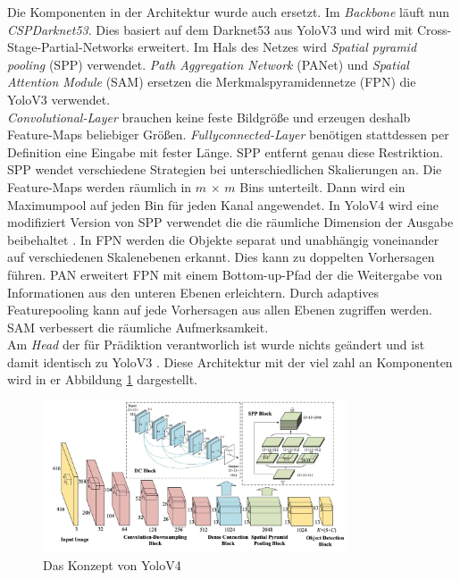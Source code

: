 \documentclass[conference]{IEEEtran}
\begin{document}
	Die Komponenten in der Architektur wurde auch ersetzt. Im \textit{Backbone} läuft nun \textit{CSPDarknet53}. Dies basiert auf dem Darknet53 aus YoloV3 und wird mit Cross-Stage-Partial-Networks erweitert. Im Hals des Netzes wird \textit{Spatial pyramid pooling} (SPP) verwendet. \textit{Path Aggregation Network} (PANet) und \textit{Spatial Attention Module} (SAM) ersetzen die Merkmalspyramidennetze (FPN) die YoloV3 verwendet.\\
	\textit{Convolutional-Layer} brauchen keine feste Bildgröße und erzeugen deshalb  Feature-Maps beliebiger Größen. \textit{Fullyconnected-Layer} benötigen stattdessen per Definition eine Eingabe mit fester Länge. SPP entfernt genau diese Restriktion. SPP wendet verschiedene Strategien bei unterschiedlichen Skalierungen an. Die Feature-Maps werden räumlich in $m$ × $m$ Bins unterteilt. Dann wird ein Maximumpool auf jeden Bin für jeden Kanal angewendet. In YoloV4 wird eine modifiziert Version von SPP verwendet die die räumliche Dimension der Ausgabe beibehaltet \cite{b9}.
	In FPN werden die Objekte separat und unabhängig voneinander auf verschiedenen Skalenebenen erkannt. Dies kann zu doppelten Vorhersagen führen. PAN erweitert FPN mit einem Bottom-up-Pfad der die Weitergabe von Informationen aus den unteren Ebenen erleichtern. Durch adaptives Featurepooling kann auf jede Vorhersagen aus allen Ebenen zugriffen werden.\cite{b10}\\
	SAM verbessert die räumliche Aufmerksamkeit.\\
	Am \textit{Head} der für Prädiktion verantworlich ist wurde nichts geändert und  ist damit identisch zu YoloV3 \cite{b2}\cite{b8}. Diese Architektur mit der viel zahl an Komponenten wird in er Abbildung \ref{V4Arch} dargestellt.
	\begin{figure}[!h]
		\begin{center}
			\includegraphics[width=9cm]{Media/YoloV4Arch.jpeg}
			\caption{Das Konzept von YoloV4 \cite{b8}}
			\label{V4Arch}
		\end{center}
	\end{figure}\\
\end{document}
